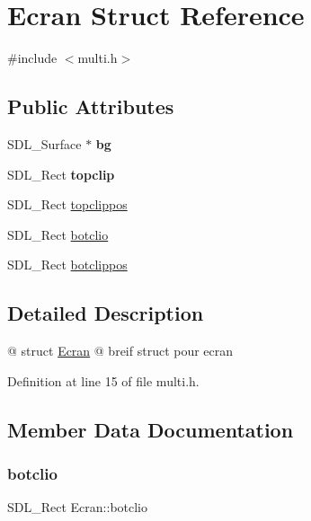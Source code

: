 \hypertarget{structEcran}{}\section{Ecran Struct Reference}
\label{structEcran}


{\ttfamily \#include $<$multi.\+h$>$}

\subsection*{Public Attributes}
\begin{DoxyCompactItemize}
\item 
\mbox{\label{structEcran_a80c0bd64b099ee51c552c1bcd599afb3}} 
S\+D\+L\+\_\+\+Surface $\ast$ {\bfseries bg}
\item 
\mbox{\label{structEcran_af5556472d34251da2ac8fc316396d30d}} 
S\+D\+L\+\_\+\+Rect {\bfseries topclip}
\item 
S\+D\+L\+\_\+\+Rect \hyperlink{structEcran_aea06b9168f992fa7e6a1bbb2dfcd11e3}{topclippos}
\item 
S\+D\+L\+\_\+\+Rect \hyperlink{structEcran_ad2245fc9d88143acda177a76ad613d9f}{botclio}
\item 
S\+D\+L\+\_\+\+Rect \hyperlink{structEcran_ab08e2f16c938be034346c7267fad5cf1}{botclippos}
\end{DoxyCompactItemize}


\subsection{Detailed Description}
@ struct \hyperlink{structEcran}{Ecran} @ breif struct pour ecran 

Definition at line 15 of file multi.\+h.



\subsection{Member Data Documentation}
\mbox{\label{structEcran_ad2245fc9d88143acda177a76ad613d9f}} 
\subsubsection{\texorpdfstring{botclio}{botclio}}
{\footnotesize\ttfamily S\+D\+L\+\_\+\+Rect Ecran\+::botclio}

